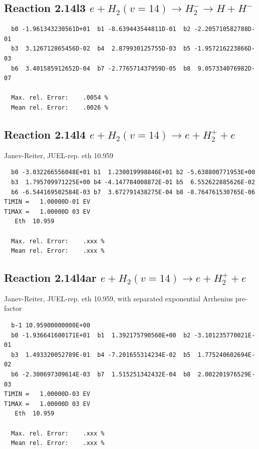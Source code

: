 \documentclass[12pt,dvipdfmx]{article}
\begin{document}
\subsection{
Reaction 2.14l3
 $ e + H_2(v=14) \rightarrow H_2^- \rightarrow H + H^-$
}


\begin{small}\begin{verbatim}
  b0 -1.961343230561D+01  b1 -8.639443544811D-01  b2 -2.205710582788D-01
  b3  3.126712865456D-02  b4  2.879930125755D-03  b5 -1.957216223866D-03
  b6  3.401585912652D-04  b7 -2.776571437959D-05  b8  9.057334076982D-07

  Max. rel. Error:    .0054 %
  Mean rel. Error:    .0026 %
\end{verbatim}\end{small}

\subsection{
Reaction 2.14l4
 $ e + H_2(v=14) \rightarrow e + H_2^+  + e$
}
Janev-Reiter, JUEL-rep. eth  10.959

\begin{small}\begin{verbatim}
  b0 -3.032266556048E+01 b1  1.230019998846E+01 b2 -5.638800771953E+00
  b3  1.795709971225E+00 b4 -4.147784008872E-01 b5  6.552622885626E-02
  b6 -6.544169502584E-03 b7  3.672791438275E-04 b8 -8.764761530765E-06
T1MIN =   1.00000D-01 EV
T1MAX =   1.00000D 03 EV
   Eth  10.959

  Max. rel. Error:    .xxx %
  Mean rel. Error:    .xxx %
\end{verbatim}\end{small}


\subsection{
Reaction 2.14l4ar
 $ e + H_2(v=14) \rightarrow e + H_2^+  + e$
}
Janev-Reiter, JUEL-rep. eth  10.959,
with separated exponential Arrhenius pre-factor

\begin{small}\begin{verbatim}
  b-1 10.95900000000E+00
  b0 -1.936641600171E+01  b1  1.392175790560E+00  b2 -3.101235770021E-01
  b3  1.493320052789E-01  b4 -7.201655314234E-02  b5  1.775240602694E-02
  b6 -2.300697309614E-03  b7  1.515251342432E-04  b8  2.002201976529E-03
T1MIN =   1.00000D-03 EV
T1MAX =   1.00000D 03 EV
   Eth  10.959

  Max. rel. Error:    .xxx %
  Mean rel. Error:    .xxx %

\end{verbatim}\end{small}
\newpage
\end{document}
